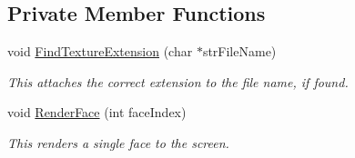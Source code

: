 \subsection*{Private Member Functions}
\begin{DoxyCompactItemize}
\item 
void \hyperlink{class_b_s_pfile_ae1f8be78e62a72e8d38f5858bddb9c1b}{Find\+Texture\+Extension} (char $\ast$str\+File\+Name)\hypertarget{class_b_s_pfile_ae1f8be78e62a72e8d38f5858bddb9c1b}{}\label{class_b_s_pfile_ae1f8be78e62a72e8d38f5858bddb9c1b}

\begin{DoxyCompactList}\small\item\em This attaches the correct extension to the file name, if found. \end{DoxyCompactList}\item 
void \hyperlink{class_b_s_pfile_a25c51a5f92f9fe447dbbb1c33785c117}{Render\+Face} (int face\+Index)\hypertarget{class_b_s_pfile_a25c51a5f92f9fe447dbbb1c33785c117}{}\label{class_b_s_pfile_a25c51a5f92f9fe447dbbb1c33785c117}

\begin{DoxyCompactList}\small\item\em This renders a single face to the screen. \end{DoxyCompactList}\end{DoxyCompactItemize}
